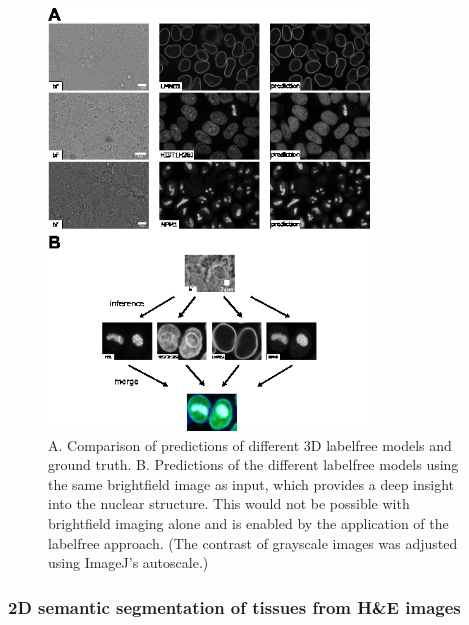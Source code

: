 \begin{figure}
\hypertarget{fig:labelfree_all_structures}{%
\centering
\includegraphics[width=0.76\textwidth,height=0.9\textheight]{images/labelfree_all_justin.png}
\caption{A. Comparison of predictions of different 3D labelfree models and ground truth. B. Predictions of the different labelfree models using the same brightfield image as input, which provides a deep insight into the nuclear structure. This would not be possible with brightfield imaging alone and is enabled by the application of the labelfree approach. (The contrast of grayscale images was adjusted using ImageJ's autoscale.)}\label{fig:labelfree_all_structures}
}
\end{figure}

\hypertarget{d-semantic-segmentation-of-tissues-from-he-images}{%
\subsubsection{2D semantic segmentation of tissues from H\&E images}\label{d-semantic-segmentation-of-tissues-from-he-images}}

